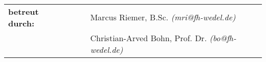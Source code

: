 \documentclass[a4paper, 12pt, hidelinks]{report}
\begin{document}
\begin{verbatim}


\end{verbatim}

\begin{flushleft}
\begin{tabular}{llll}

\textbf{betreut durch:}
& & & Marcus Riemer, B.Sc. \emph{(mri@fh-wedel.de)}\\
& & & Christian-Arved Bohn, Prof. Dr. \emph{(bo@fh-wedel.de)}\\

\end{tabular}
\end{flushleft}


\newpage


\newpage


\tableofcontents
\listoffigures
\newpage









\end{document}
